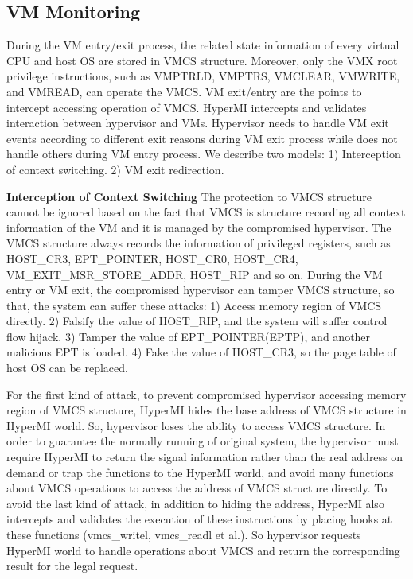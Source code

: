 \documentclass[conference]{IEEEtran}
\begin{document}
\fi



\subsection{VM Monitoring}\label{vmmonitor}

During the VM entry/exit process, the related state information of every virtual CPU and host OS are stored in VMCS structure. 
Moreover, only the VMX root privilege instructions, such as VMPTRLD, VMPTRS, VMCLEAR, VMWRITE, and VMREAD, can operate the VMCS.
VM exit/entry are the points to intercept accessing operation of VMCS. HyperMI intercepts and validates interaction between hypervisor and VMs. Hypervisor needs to handle VM exit events according to different exit reasons during VM exit process while does not handle others during VM entry process. We describe two models: 1) Interception of context switching. 2) VM exit redirection.

\textbf{Interception of Context Switching}
The protection to VMCS structure cannot be ignored based on the fact that VMCS is structure recording all context information of the VM and it is managed by the compromised hypervisor. 
The VMCS structure always records the information of privileged registers, such as HOST\_CR3, EPT\_POINTER, HOST\_CR0, HOST\_CR4, VM\_EXIT\_MSR\_STORE\_ADDR, HOST\_RIP and so on. During the VM entry or VM exit, the compromised hypervisor can tamper VMCS structure, so that, the system can suffer these attacks: 1) Access memory region of VMCS directly. 2) Falsify the value of HOST\_RIP, and the system will suffer control flow hijack. 3) Tamper the value of EPT\_POINTER(EPTP), and another malicious EPT is loaded. 4) Fake the value of HOST\_CR3, so the page table of host OS can be replaced.

For the first kind of attack, to prevent compromised hypervisor accessing memory region of VMCS structure, HyperMI hides the base address of VMCS structure in HyperMI world. So, hypervisor loses the ability to access VMCS structure. In order to guarantee the normally running of original system, the hypervisor must require HyperMI to return the signal information rather than the real address on demand or trap the functions to the HyperMI world, and avoid many functions about VMCS operations to access the address of VMCS structure directly. To avoid the last kind of attack, in addition to hiding the address, HyperMI also intercepts and validates the execution of these instructions by placing hooks at these functions (vmcs\_writel, vmcs\_readl et al.). So hypervisor requests HyperMI world to handle operations about VMCS and return the corresponding result for the legal request. 
\end{document}
